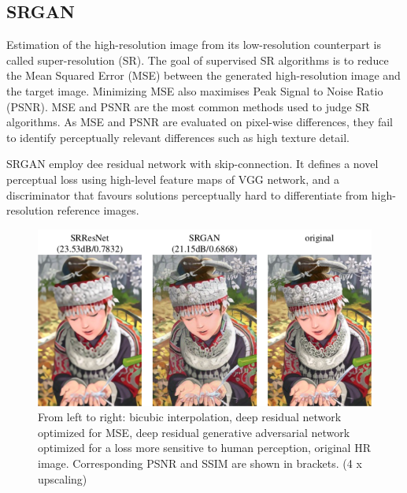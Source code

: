 \begin{onehalfspace}
    \section{SRGAN}
    Estimation of the high-resolution image from its low-resolution counterpart 
    is called super-resolution (SR). The goal of supervised SR algorithms is to 
    reduce the Mean Squared Error (MSE) between the generated high-resolution 
    image and the target image. Minimizing  MSE also maximises Peak Signal to 
    Noise Ratio (PSNR). MSE and PSNR are the most common methods used to judge 
    SR algorithms. 
    As MSE and PSNR are evaluated on pixel-wise differences, they fail to 
    identify perceptually relevant differences such as high texture detail. 

    SRGAN \cite{srgan} employ dee residual network with skip-connection. It defines a novel 
    perceptual loss using high-level feature maps of VGG network, and a 
    discriminator that favours solutions perceptually hard to differentiate 
    from high-resolution reference images.

    \begin{figure}[h]
        \caption{From left to right: bicubic interpolation, deep residual 
        network optimized for MSE, deep residual generative adversarial network 
        optimized for a loss more sensitive to human perception, original 
        HR image. Corresponding PSNR and SSIM are shown in brackets. 
        (4 x upscaling) \cite{srgan}}
        \centering
        \includegraphics[width=0.9\linewidth]{images/srgan.png}
    \end{figure} 

\end{onehalfspace}